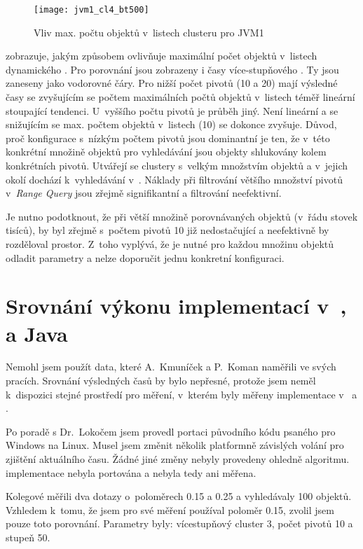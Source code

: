 \begin{figure}[t]
\centering
\texttt{[image: jvm1\_cl4\_bt500]}
\caption{Vliv max. počtu objektů v~listech clusteru pro JVM1}
\label{fig:jvm1cl4_bt500}
\end{figure}

 zobrazuje, jakým způsobem ovlivňuje maximální počet objektů v~listech dynamického .
Pro porovnání jsou zobrazeny i časy více-stupňového .
Ty jsou zaneseny jako vodorovné čáry.
Pro nižší počet pivotů (\num{10} a \num{20}) mají výsledné časy se zvyšujícím se počtem maximálních počtů objektů v~listech téměř lineární stoupající tendenci.
U~vyššího počtu pivotů je průběh jiný.
Není lineární a se snižujícím se max. počtem objektů v~listech (\num{10}) se dokonce zvyšuje.
Důvod, proč konfigurace s~nízkým počtem pivotů jsou dominantní je ten, že v~této konkrétní množině objektů pro vyhledávání jsou objekty shlukovány kolem konkrétních pivotů.
Utvářejí se clustery s~velkým množstvím objektů a v~jejich okolí dochází k~vyhledávání v~\BPTree{}.
Náklady při filtrování většího množství pivotů v~\emph{Range Query} jsou zřejmě signifikantní a filtrování neefektivní.

Je nutno podotknout, že při větší množině porovnávaných objektů (v~řádu stovek tisíců), by byl zřejmě \MIndex{} s~počtem pivotů 10 již nedostačující a neefektivně by rozděloval prostor.
Z~toho vyplývá, že je nutné pro každou množinu objektů odladit parametry  a nelze doporučit jednu konkretní konfiguraci.

\section{Srovnání výkonu implementací v~{\protect \CC}, {\protect \CS} a Java}
Nemohl jsem použít data, které A.~Kmuníček a P.~Koman naměřili ve svých pracích\cite{Kmunicek2011thesis}\cite{Koman2012thesis}.
Srovnání výsledných časů by bylo nepřesné, protože jsem neměl k~dispozici stejné prostředí pro měření, v~kterém byly měřeny implementace v~\CC{} a \CS{}.

Po poradě s Dr.~Lokočem jsem provedl portaci původního kódu \CC{} psaného pro Windows na Linux.
Musel jsem změnit několik platformně závislých volání pro zjištění aktuálního času.
Žádné jiné změny nebyly provedeny ohledně algoritmu.
\CS{} implementace nebyla portována a nebyla tedy ani měřena.

Kolegové měřili dva dotazy o~poloměrech \num{0.15} a \num{0.25} a vyhledávaly \num{100} objektů.
Vzhledem k~tomu, že jsem pro své měření používal poloměr \num{0.15}, zvolil jsem pouze toto porovnání.
Parametry  byly: vícestupňový cluster \num{3}, počet pivotů \num{10} a stupeň \BPTree{} \num{50}.

